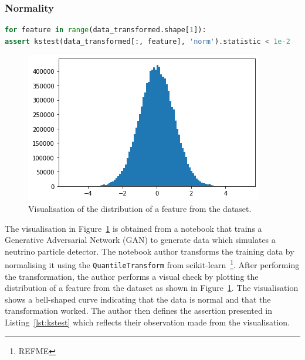 \documentclass[conference]{IEEEtran}
\begin{document}
\subsubsection{Normality}\label{sec:normal}

\begin{lstlisting}[language=Python, caption={Assertion to check that each feature in a dataset is normal. The distribution of each feature is compared to that of a normal distribution using the Kolmogorov-Smirnov test for goodness of fit from the scipy library.}, label={lst:ktest}]
for feature in range(data_transformed.shape[1]):
assert kstest(data_transformed[:, feature], 'norm').statistic < 1e-2
\end{lstlisting}

\begin{figure}
  \includegraphics[width=\linewidth]{../catalogue/select-152a.png}
  \caption{Visualisation of the distribution of a feature from the dataset.}\label{fig:kstest}
\end{figure}

The visualisation in Figure~\ref{fig:kstest} is obtained from a notebook that trains a Generative Adversarial Network (GAN) to generate data which simulates a neutrino particle detector. The notebook author transforms the training data by normalising it using the \texttt{QuantileTransform} from scikit-learn~\footnote{REFME}. After performing the transformation, the author performs a visual check by plotting the distribution of a feature from the dataset as shown in Figure~\ref{fig:kstest}. The visualisation shows a bell-shaped curve indicating that the data is normal and that the transformation worked. The author then defines the assertion presented in Listing~\ref{lst:kstest} which reflects their observation made from the visualisation.
\end{document}
